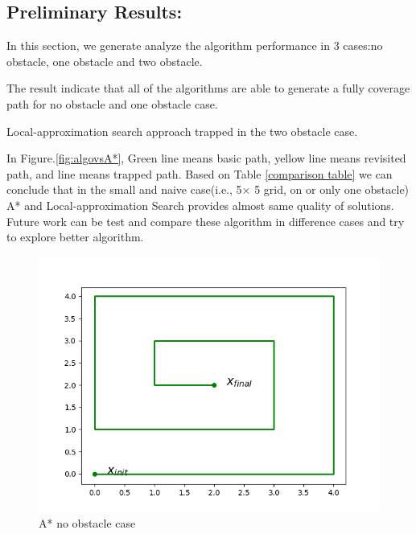 \documentclass{article}
\begin{document}
\begin{normalsize}
            
        \section{Preliminary Results:}
        In this section, we generate analyze the algorithm performance in 3 cases:no obstacle, one obstacle and two obstacle. 
        
        The result indicate that all of the algorithms are able to generate a fully coverage path for no obstacle and one obstacle case. 
        
        Local-approximation search approach trapped in the two obstacle case. 
        
        In Figure.\ref{fig:algovsA*}, Green line means basic path, yellow line means revisited path, and line means trapped path. Based on Table \ref{comparison table} we can conclude that in the small and naive case(i.e., 5$\times$ 5 grid, on or only one obstacle) A* and Local-approximation Search provides almost same quality of solutions. 
        Future work can be test and compare these algorithm in difference cases and try to explore better algorithm. 
        \begin{figure}
    \centering
    \begin{minipage}{.33\textwidth}
      \centering
      \includegraphics[width=\linewidth]{deliverables/Astar_output_no_obs.png}
      \caption{A* no obstacle case}
    \end{minipage}%
    \begin{minipage}{.33\textwidth}
      \centering

\end{minipage}
\end{figure}
\end{normalsize}
\end{document}
